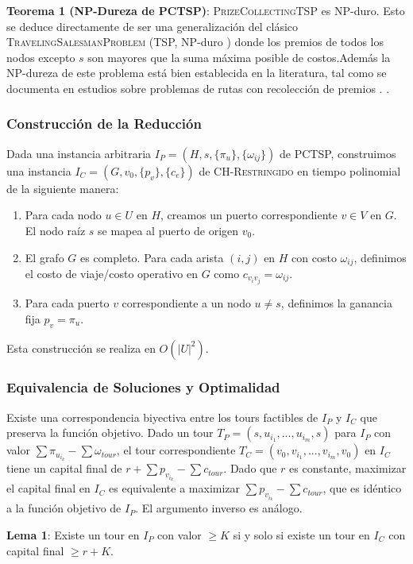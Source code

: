 \documentclass{article}
\begin{document}
\textbf{Teorema 1 (NP-Dureza de PCTSP)}: \textsc{PrizeCollectingTSP} es NP-duro. Esto se deduce directamente de ser una generalización del clásico \textsc{TravelingSalesmanProblem} (TSP, NP-duro \cite{karp1972}) donde los premios de todos los nodos excepto $s$ son mayores que la suma máxima posible de costos.Además la NP-dureza de este problema está bien establecida en la literatura, tal como se documenta en estudios sobre problemas de rutas con recolección de premios \cite{MarchettiSpaccamela2007PrizeCollectingTS}.
\cite{MarchettiSpaccamela2007PrizeCollectingTS}.
\subsubsection*{Construcción de la Reducción} 
Dada una instancia arbitraria $I_{P} = (H, s, \{\pi_u\}, \{\omega_{ij}\})$ de PCTSP, construimos una instancia $I_{C} = (G, v_0, \{p_v\}, \{c_{e}\})$ de \textsc{CH-Restringido} en tiempo polinomial de la siguiente manera: 
\begin{enumerate} 
    \item Para cada nodo $u \in U$ en $H$, creamos un puerto correspondiente $v \in V$ en $G$. El nodo raíz $s$ se mapea al puerto de origen $v_0$. 
    \item El grafo $G$ es completo. Para cada arista $(i,j)$ en $H$ con costo $\omega_{ij}$, definimos el costo de viaje/costo operativo en $G$ como $c_{v_i v_j} = \omega_{ij}$. 
    \item Para cada puerto $v$ correspondiente a un nodo $u \neq s$, definimos la ganancia fija $p_v = \pi_u$. 
\end{enumerate} 
Esta construcción se realiza en $O(|U|^2)$.

\subsubsection*{Equivalencia de Soluciones y Optimalidad} 
Existe una correspondencia biyectiva entre los tours factibles de $I_P$ y $I_C$ que preserva la función objetivo. Dado un tour $T_P = (s, u_{i_1}, ..., u_{i_m}, s)$ para $I_P$ con valor $\sum \pi_{u_{i_k}} - \sum \omega_{tour}$, el tour correspondiente $T_C = (v_0, v_{i_1}, ..., v_{i_m}, v_0)$ en $I_C$ tiene un capital final de $r + \sum p_{v_{i_k}} - \sum c_{tour}$. Dado que $r$ es constante, maximizar el capital final en $I_C$ es equivalente a maximizar $\sum p_{v_{i_k}} - \sum c_{tour}$, que es idéntico a la función objetivo de $I_P$. El argumento inverso es análogo.

\textbf{Lema 1}: Existe un tour en $I_P$ con valor $\geq K$ si y solo si existe un tour en $I_C$ con capital final $\geq r + K$.
\end{document}
